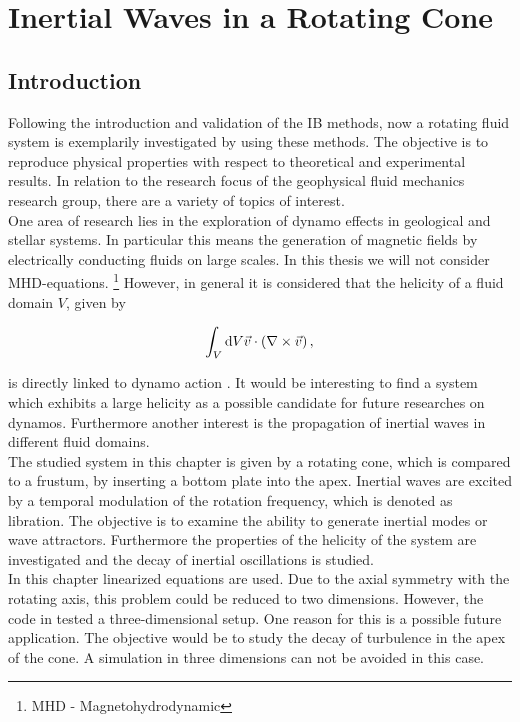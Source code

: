 \chapter{Inertial Waves in a Rotating Cone}

\section{Introduction}

Following the introduction and validation of the IB methods, now
a rotating fluid system is exemplarily investigated by using these methods.
The objective is to reproduce  physical properties with respect to theoretical and experimental results.
In relation to the research focus of the geophysical fluid mechanics research group, there are a variety
of topics of interest.\\
One area of research lies in the exploration of dynamo effects in geological and stellar systems.
In particular this means the generation of magnetic fields by electrically conducting fluids on large scales.
In this thesis we will not consider MHD-equations.  \footnote{MHD - Magnetohydrodynamic}
However, in general it is considered that the helicity of a fluid domain $V$, given by

\begin{align}
    \int_{V}\mathop{}\!\mathrm{d} V  \vec{v} \cdot \left( \nabla \times \vec{v} \right),
\end{align}

is directly linked to dynamo action \citep{moffat1978}.
It would be interesting to find a system which exhibits a large helicity
as a possible candidate for future researches on dynamos.
Furthermore another interest is the propagation of inertial waves in different fluid domains.\\
The studied system in this chapter is given by a rotating cone, which is compared to
a frustum, by inserting a bottom plate into the apex.
Inertial waves are excited by a temporal modulation of the rotation frequency, which is denoted as libration.
The objective is to examine the ability to generate inertial modes or wave attractors.
Furthermore the properties of the helicity of the system are investigated and the
decay of inertial oscillations is studied.\\
In this chapter linearized equations are used. Due to the axial symmetry with the rotating axis,
this problem could be reduced to two dimensions.
However, the code in tested a three-dimensional setup.
One reason for this is a possible future application.
The objective would be to study the decay of turbulence in the apex of the cone.
A simulation in three dimensions can not be avoided in this case.


